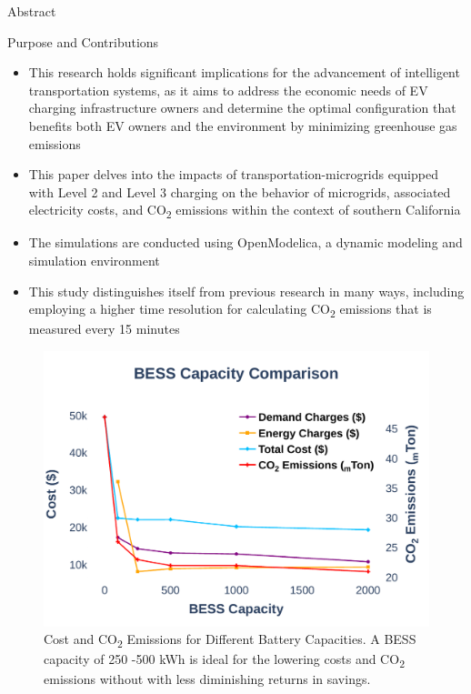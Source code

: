 \documentclass[final, 36 pt]{beamer}
\newlength{\onecolwid}
\begin{document}
\begin{frame}[t]
\begin{columns}[t]
\begin{column}{\onecolwid}
\begin{alertblock}{Abstract}
\end{alertblock}
\begin{alertblock}{Purpose and Contributions}
	\begin{itemize}
		\item This research holds significant implications for the advancement of intelligent transportation systems, as it aims to address the economic needs of EV charging infrastructure owners and determine the optimal configuration that benefits both EV owners and the environment by minimizing greenhouse gas emissions
		\item This paper delves into the impacts of transportation-microgrids equipped with Level 2 and Level 3 charging on the behavior of microgrids, associated electricity costs, and CO\textsubscript{2} emissions within the context of southern California
		\item The simulations are conducted using OpenModelica, a dynamic modeling and simulation environment
		\item This study distinguishes itself from previous research in many ways, including employing a higher time resolution for calculating CO\textsubscript{2} emissions that is measured every 15 minutes
	\end{itemize}
\end{alertblock}

\begin{block}{}
		\begin{figure}[!htb] 		
		\includegraphics[width=\linewidth]{Fig/bess_capacity_comparison_large_font}
		\caption{\large Cost and CO\textsubscript{2} Emissions for Different Battery Capacities. A BESS capacity of 250 -500 kWh is ideal for the lowering costs and CO\textsubscript{2} emissions without with less diminishing returns in savings. }
		\label{fig:besscapacitycomparison}		
	\end{figure}
\end{block}


\end{column}
\end{columns}
\end{frame}
\end{document}
